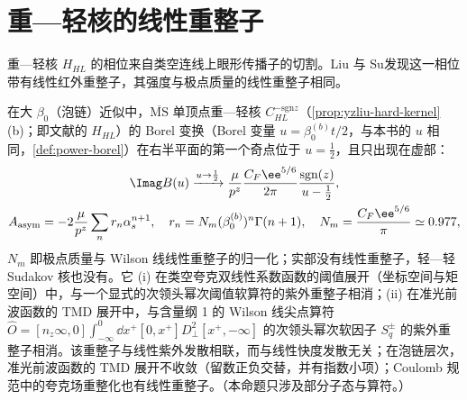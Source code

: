 \section{重—轻核的线性重整子}\label{sec:yzliu-renormalon}

重—轻核 $H_{HL}$ 的相位来自类空连线上眼形传播子的切割。Liu 与 Su\cite{Liu:2023onm}发现这一相位带有线性红外重整子，其强度与极点质量的线性重整子相同。

\begin{proposition}\label{prop:yzliu-linear-renormalon}
在大 $\beta_0$（泡链）近似中，$\overline{\mathrm{MS}}$ 单顶点重—轻核 $C^{-\mathrm{sgn}z}_{HL}$（\cref{prop:yzliu-hard-kernel}(b)；即文献\cite{Liu:2023onm}的 $H_{HL}$）的 Borel 变换（Borel 变量 $u=\beta_0^{(b)}t/2$，与本书的 $u$ 相同，\cref{def:power-borel}）在右半平面的第一个奇点位于 $u=\frac12$，且只出现在虚部： %
\begin{equation}\label{eq:yzliu-renormalon}
\begin{gathered}
\Imag B(u)\xrightarrow{u\to\frac12}\frac{\mu}{p^z}\frac{C_F\ee^{5/6}}{2\pi}\frac{\mathrm{sgn}(z)}{u-\frac12},\\
A_{\mathrm{asym}}=-2\frac{\mu}{p^z}\sum_nr_n\alpha_s^{n+1},\quad r_n=N_m(\beta_0^{(b)})^n\Gamma(n+1),\quad N_m=\frac{C_F\ee^{5/6}}{\pi}\simeq0.977,
\end{gathered}
\end{equation}
$N_m$ 即极点质量与 Wilson 线线性重整子的归一化；实部没有线性重整子，轻—轻 Sudakov 核也没有。它 (i) 在类空夸克双线性系数函数的阈值展开（坐标空间与矩空间）中，与一个显式的次领头幂次阈值软算符的紫外重整子相消；(ii) 在准光前波函数的 TMD 展开中，与含量纲 1 的 Wilson 线尖点算符 $\hat O=[n_z\infty,0]\int_{-\infty}^0\dd x^+[0,x^+]D_\perp^2[x^+,-\infty]$ 的次领头幂次软因子 $S^\pm_q$ 的紫外重整子相消。该重整子与线性紫外发散相联，而与线性快度发散无关；在泡链层次，准光前波函数的 TMD 展开不收敛（留数正负交替，并有指数小项）；Coulomb 规范中的夸克场重整化也有线性重整子。（本命题只涉及部分子态与算符。）
\end{proposition}

